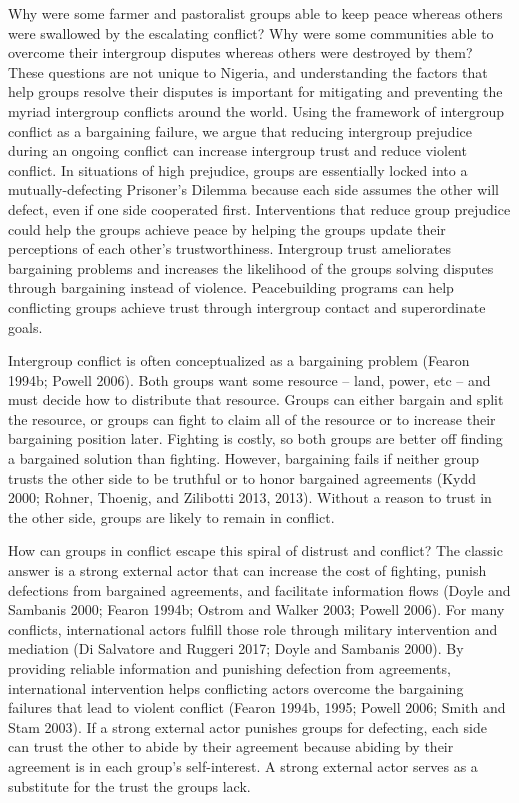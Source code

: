 \documentclass[11pt]{article}
\begin{document}
Why were some farmer and pastoralist groups able to keep peace whereas
others were swallowed by the escalating conflict? Why were some
communities able to overcome their intergroup disputes whereas others
were destroyed by them? These questions are not unique to Nigeria, and
understanding the factors that help groups resolve their disputes is
important for mitigating and preventing the myriad intergroup conflicts
around the world. Using the framework of intergroup conflict as a
bargaining failure, we argue that reducing intergroup prejudice during
an ongoing conflict can increase intergroup trust and reduce violent
conflict. In situations of high prejudice, groups are essentially locked
into a mutually-defecting Prisoner's Dilemma because each side assumes
the other will defect, even if one side cooperated first. Interventions
that reduce group prejudice could help the groups achieve peace by
helping the groups update their perceptions of each other's
trustworthiness. Intergroup trust ameliorates bargaining problems and
increases the likelihood of the groups solving disputes through
bargaining instead of violence. Peacebuilding programs can help
conflicting groups achieve trust through intergroup contact and
superordinate goals.

Intergroup conflict is often conceptualized as a bargaining problem
(Fearon 1994b; Powell 2006). Both groups want some resource -- land,
power, etc -- and must decide how to distribute that resource. Groups
can either bargain and split the resource, or groups can fight to claim
all of the resource or to increase their bargaining position later.
Fighting is costly, so both groups are better off finding a bargained
solution than fighting. However, bargaining fails if neither group
trusts the other side to be truthful or to honor bargained agreements
(Kydd 2000; Rohner, Thoenig, and Zilibotti 2013, 2013). Without a reason
to trust in the other side, groups are likely to remain in conflict.

How can groups in conflict escape this spiral of distrust and conflict?
The classic answer is a strong external actor that can increase the cost
of fighting, punish defections from bargained agreements, and facilitate
information flows (Doyle and Sambanis 2000; Fearon 1994b; Ostrom and
Walker 2003; Powell 2006). For many conflicts, international actors
fulfill those role through military intervention and mediation (Di
Salvatore and Ruggeri 2017; Doyle and Sambanis 2000). By providing
reliable information and punishing defection from agreements,
international intervention helps conflicting actors overcome the
bargaining failures that lead to violent conflict (Fearon 1994b, 1995;
Powell 2006; Smith and Stam 2003). If a strong external actor punishes
groups for defecting, each side can trust the other to abide by their
agreement because abiding by their agreement is in each group's
self-interest. A strong external actor serves as a substitute for the
trust the groups lack.
\end{document}
